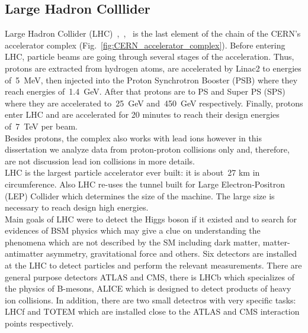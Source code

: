 \subsection{Large Hadron Colllider}
Large Hadron Collider (LHC)~\cite{ref_LHC_brochure},~\cite{ref_LHC_TDR},~\cite{ref_LHC_website} is the last element of the chain of the CERN's accelerator complex (Fig.~\ref{fig:CERN_accelerator_complex}). Before entering LHC, particle beams are going through several stages of the acceleration. Thus, protons are extracted from hydrogen atoms, are accelerated by Linac2 to energies of~5~MeV, then injected into the Proton Synchrotron Booster (PSB) where they reach energies of~1.4~GeV. After that protons are to PS and Super PS (SPS) where they are accelerated to~25~GeV and~450~GeV respectively. Finally, protons enter LHC and are accelerated for 20 minutes to reach their design energies of~7~TeV per beam. \\

Besides protons, the complex also works with lead ions however in this dissertation we analyze data from proton-proton collisions only and, therefore, are not discussion lead ion collisions in more details.\\    


LHC is the largest particle accelerator ever built: it is about~27 km in circumference. Also LHC re-uses the tunnel built for Large Electron-Positron (LEP) Collider which determines the size of the machine. The large size is necessary to reach design high energies. \\

Main goals of LHC were to detect the Higgs boson if it existed and to search for evidences of BSM physics which may give a clue on understanding the phenomena which are not described by the SM including dark matter, matter-antimatter asymmetry, gravitational force and others. Six detectors are installed at the LHC to detect particles and perform the relevant measurements. There are general purpose detectors ATLAS and CMS, there is LHCb which specializes of the physics of B-mesons, ALICE which is designed to detect products of heavy ion collisions. In addition, there are two small detectros with very specific tasks: LHCf and TOTEM which are installed close to the ATLAS and CMS interaction points respectively. \\

